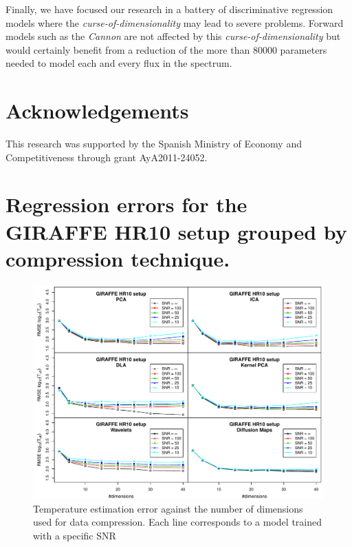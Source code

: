 \documentclass[a4paper,fleqn,usenatbib]{mnras}
\begin{document}
{{{Finally, we have focused our research in a battery of discriminative regression 
models where the {\it curse-of-dimensionality} may lead to severe problems. Forward 
models such as the {\it Cannon} \citep{2015ApJ...808...16N} are not affected by 
this {\it curse-of-dimensionality} but would certainly benefit from a reduction 
of the more than 80000 parameters needed to model each and every flux in the spectrum.

\section*{Acknowledgements}
This research was supported by the Spanish Ministry of Economy and
Competitiveness through grant AyA2011-24052.










\appendix

\section{Regression errors for the GIRAFFE HR10 setup grouped by compression technique.}
\label{a1}
\begin{figure}
\centering\includegraphics[width=\textwidth]{flamesHR10_Teff_log_BestSVM_N-SNR-RMSE_test.pdf}
\caption{Temperature estimation error against the number of dimensions
  used for data compression. Each line corresponds to a model trained
  with a specific SNR}
\label{fig:methodsnrTeff}
\end{figure}

}}}
\end{document}
